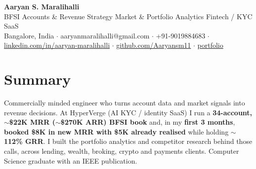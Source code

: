 \documentclass[10pt,a4paper]{article}
\begin{document}
\vspace*{-1cm}
\begin{center}
{\LARGE\bfseries Aaryan S. Maralihalli}\\[0.5em]
{\large BFSI Accounts \& Revenue Strategy  \textbar{}  Market \& Portfolio Analytics  \textbar{}  Fintech / KYC SaaS}\\[0.3em]
Bangalore, India $\cdot$ aaryanmaralihalli@gmail.com $\cdot$ +91-9019884683 $\cdot$ \href{https://linkedin.com/in/aaryan-maralihalli}{linkedin.com/in/aaryan-maralihalli} $\cdot$ \href{https://github.com/Aaryansm11}{github.com/Aaryansm11} $\cdot$ \href{https://portfolio-zeta-ten-85.vercel.app}{portfolio}
\end{center}\vspace{0.4ex}
\section*{Summary}
Commercially minded engineer who turns account data and market signals into revenue decisions. At HyperVerge (AI KYC / identity SaaS) I run a \textbf{34-account, $\sim$\$22K MRR ($\sim$\$270K ARR) BFSI book} and, in my \textbf{first 3 months}, \textbf{booked \$8K in new MRR with \$5K already realised} while holding \textbf{$\sim$112\% GRR}. I built the portfolio analytics and competitor research behind those calls, across lending, wealth, broking, crypto and payments clients. Computer Science graduate with an IEEE publication.\par\vspace{2pt}
\end{document}
